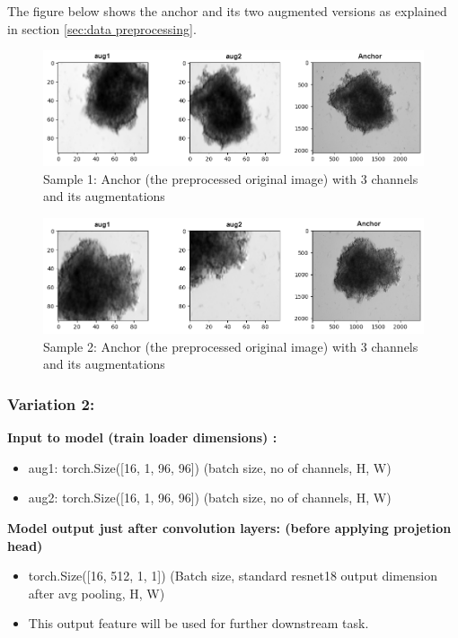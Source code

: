 The figure below shows the anchor and its two augmented versions as explained in section \ref{sec:data preprocessing}.

\begin{figure}[H]
  \centering
  \includegraphics[width=0.9\linewidth]{figures/3_1.png} %
  \caption{Sample 1: Anchor (the preprocessed original image) with 3 channels and its augmentations}
  \label{fig:augmentation}
\end{figure}


  \begin{figure}[H]
    \centering
    \includegraphics[width=0.9\linewidth]{figures/3_2fine.png} %
    \caption{Sample 2: Anchor (the preprocessed original image) with 3 channels and its augmentations}
    \label{fig:augmentations}
  \end{figure}
\subsubsection{Variation 2:}

\textbf{Input to model (train loader dimensions) :} 
\begin{itemize}
   \item aug1: torch.Size([16, 1, 96, 96])        (batch size, no of channels, H, W)
   \item aug2: torch.Size([16, 1, 96, 96])        (batch size, no of channels, H, W) \vspace{1em}
\end{itemize}
\textbf{Model output just after convolution layers: (before applying projetion head)} 
\begin{itemize}
  \item torch.Size([16, 512, 1, 1]) (Batch size, standard resnet18 output dimension after avg pooling, H, W)   
  \item This output feature will be used for further downstream task.  \vspace{1em}
\end{itemize}

